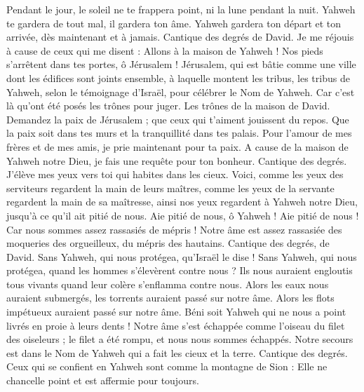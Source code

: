 \begin{multicols}{2}
Pendant le jour, le soleil ne te frappera point, ni la lune pendant la nuit.
Yahweh te gardera de tout mal, il gardera ton âme.
Yahweh gardera ton départ et ton arrivée, dès maintenant et à jamais.
\VerseOne{}Cantique des degrés de David. Je me réjouis à cause de ceux qui me disent : Allons à la maison de Yahweh !
Nos pieds s'arrêtent dans tes portes, ô Jérusalem !
Jérusalem, qui est bâtie comme une ville dont les édifices sont joints ensemble,
à laquelle montent les tribus, les tribus de Yahweh, selon le témoignage d'Israël, pour célébrer le Nom de Yahweh.
Car c'est là qu'ont été posés les trônes pour juger. Les trônes de la maison de David.
Demandez la paix de Jérusalem ; que ceux qui t'aiment jouissent du repos.
Que la paix soit dans tes murs et la tranquillité dans tes palais.
Pour l'amour de mes frères et de mes amis, je prie maintenant pour ta paix.
A cause de la maison de Yahweh notre Dieu, je fais une requête pour ton bonheur.
\VerseOne{}Cantique des degrés. J'élève mes yeux vers toi qui habites dans les cieux.
Voici, comme les yeux des serviteurs regardent la main de leurs maîtres, comme les yeux de la servante regardent la main de sa maîtresse, ainsi nos yeux regardent à Yahweh notre Dieu, jusqu'à ce qu'il ait pitié de nous.
Aie pitié de nous, ô Yahweh ! Aie pitié de nous ! Car nous sommes assez rassasiés de mépris !
Notre âme est assez rassasiée des moqueries des orgueilleux, du mépris des hautains.
\VerseOne{}Cantique des degrés, de David. Sans Yahweh, qui nous protégea, qu'Israël le dise !
Sans Yahweh, qui nous protégea, quand les hommes s'élevèrent contre nous ?
Ils nous auraient engloutis tous vivants quand leur colère s'enflamma contre nous.
Alors les eaux nous auraient submergés, les torrents auraient passé sur notre âme.
Alors les flots impétueux auraient passé sur notre âme.
Béni soit Yahweh qui ne nous a point livrés en proie à leurs dents !
Notre âme s'est échappée comme l'oiseau du filet des oiseleurs ; le filet a été rompu, et nous nous sommes échappés.
Notre secours est dans le Nom de Yahweh qui a fait les cieux et la terre.
\VerseOne{}Cantique des degrés. Ceux qui se confient en Yahweh sont comme la montagne de Sion : Elle ne chancelle point et est affermie pour toujours.

\end{multicols}
